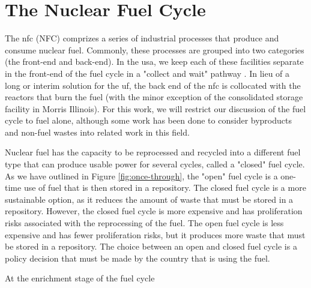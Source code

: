 \section{The Nuclear Fuel Cycle}
\label{sec:nfc}

The \acrlong{nfc} (NFC) comprizes a series of industrial processes that produce and consume nuclear fuel. Commonly, these processes are grouped into two categories (the front-end and back-end). In the \gls{usa}, we keep each of these facilities separate in the front-end of the fuel cycle in a "collect and wait" pathway \cite{cycle_risks}. In lieu of a long or interim solution for the \gls{uf}, the back end of the \gls{nfc} is collocated with the reactors that burn the fuel (with the minor exception of the consolidated storage facility in Morris Illinois). For this work, we will restrict our discussion of the fuel cycle to fuel alone, although some work has been done to consider byproducts and non-fuel wastes into related work in this field.


Nuclear fuel has the capacity to be reprocessed and recycled into a different fuel type that can produce usable power for several cycles, called a "closed" fuel cycle. As we have outlined in Figure \ref{fig:once-through}, the "open" fuel cycle is a one-time use of fuel that is then stored in a repository. The closed fuel cycle is a more sustainable option, as it reduces the amount of waste that must be stored in a repository. However, the closed fuel cycle is more expensive and has proliferation risks associated with the reprocessing of the fuel. The open fuel cycle is less expensive and has fewer proliferation risks, but it produces more waste that must be stored in a repository. The choice between an open and closed fuel cycle is a policy decision that must be made by the country that is using the fuel.








At the enrichment stage of the fuel cycle













